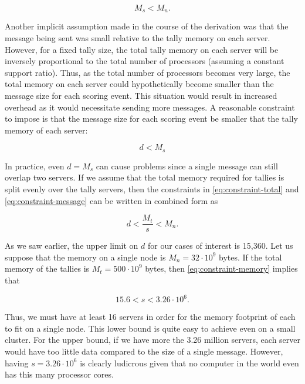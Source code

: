 \documentclass[3p]{elsarticle}
\begin{document}
\begin{equation}
  \label{eq:constraint-total}
  M_s < M_n.
\end{equation}

Another implicit assumption made in the course of the derivation was that the
message being sent was small relative to the tally memory on each
server. However, for a fixed tally size, the total tally memory on each server
will be inversely proportional to the total number of processors (assuming a
constant support ratio). Thus, as the total number of processors becomes very
large, the total memory on each server could hypothetically become smaller than
the message size for each scoring event. This situation would result in
increased overhead as it would necessitate sending more messages. A reasonable
constraint to impose is that the message size for each scoring event be smaller
that the tally memory of each server:

\begin{equation}
  \label{eq:constraint-message}
  d < M_s
\end{equation}

\noindent In practice, even $d = M_s$ can cause problems since a single message
can still overlap two servers. If we assume that the total memory required for
tallies is split evenly over the tally servers, then the constraints in
\eqref{eq:constraint-total} and \eqref{eq:constraint-message} can be written in
combined form as

\begin{equation}
  \label{eq:constraint-memory}
  d < \frac{M_t}{s} < M_n.
\end{equation}

As we saw earlier, the upper limit on $d$ for our cases of interest is
15,360. Let us suppose that the memory on a single node is $M_n = 32 \cdot 10^9$
bytes. If the total memory of the tallies is $M_t = 500 \cdot 10^9$ bytes, then
\eqref{eq:constraint-memory} implies that

\begin{equation}
  \label{eq:constraint-example}
  15.6 < s < 3.26\cdot 10^6.
\end{equation}

\noindent Thus, we must have at least 16 servers in order for the memory
footprint of each to fit on a single node. This lower bound is quite easy to
achieve even on a small cluster. For the upper bound, if we have more the 3.26
million servers, each server would have too little data compared to the size of
a single message. However, having $s = 3.26\cdot 10^6$ is clearly ludicrous
given that no computer in the world even has this many processor cores.
\end{document}
